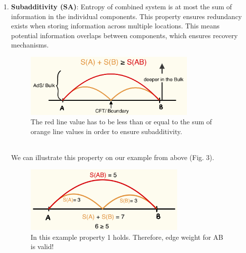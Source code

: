 \documentclass[12pt]{article}
\begin{document}
\newpage

\begin{enumerate}
    \item \textbf{Subadditivity (SA)}: Entropy of combined system is at most the sum of information in the individual components.
    This property ensures redundancy exists when storing information across multiple locations. This means potential information overlaps between components, which ensures recovery mechanisms.
    \begin{figure}[htbp]  %
        \centering
        \includegraphics[width=0.8\textwidth,height=0.2\textheight]{sa.jpeg}  %
        \caption{The red line value has to be less than or equal to the sum of orange line values in order to ensure subadditivity.}  %
        \label{fig:Subadditivity}  %
    \end{figure}
    \\
    We can illustrate this property on our example from above (Fig. 3).
    \begin{figure}[htbp]  %
        \centering
        \includegraphics[width=0.75\textwidth,height=0.2\textheight]{sa_ex.jpeg}  %
        \caption{In this example property 1 holds. Therefore, edge weight for AB is valid!}  %
        \label{fig:Subadditivity Example}  %
    \end{figure}

    \newpage


\end{enumerate}
\end{document}
